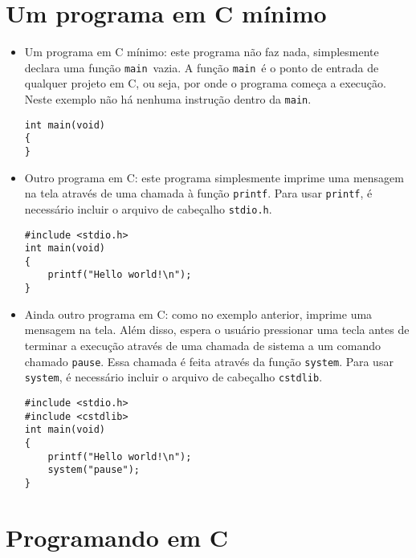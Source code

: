 \documentclass{book}
\newcommand{\MAIN}{{\tt main}}
\newcommand{\PRINTF}{{\tt printf}}
\newcommand{\SYSTEM}{{\tt system}}
\begin{document}

\section{Um programa em C mínimo}


\begin{itemize}

\item Um programa em C mínimo: este programa não faz nada, simplesmente declara uma função \MAIN\ vazia. A função \MAIN\ é o ponto de entrada de qualquer projeto em C, ou seja, por onde o programa começa a execução. Neste exemplo não há nenhuma instrução dentro da \MAIN.

\begin{lstlisting}
int main(void)
{
}
\end{lstlisting}


\item Outro programa em C: este programa simplesmente imprime uma mensagem na tela através de uma chamada à função \PRINTF. Para usar \PRINTF, é necessário incluir o arquivo de cabeçalho {\tt stdio.h}.

\begin{lstlisting}
#include <stdio.h>
int main(void)
{
    printf("Hello world!\n");
}
\end{lstlisting}


\item Ainda outro programa em C: como no exemplo anterior, imprime uma mensagem na tela. Além disso, espera o usuário pressionar uma tecla antes de terminar a execução através de uma chamada de sistema a um comando chamado {\tt pause}. Essa chamada é feita através da função \SYSTEM. Para usar \SYSTEM, é necessário incluir o arquivo de cabeçalho {\tt cstdlib}.

\begin{lstlisting}
#include <stdio.h>
#include <cstdlib>
int main(void)
{
    printf("Hello world!\n");
    system("pause");
}
\end{lstlisting}

\end{itemize}




\section{Programando em C}
\end{document}
